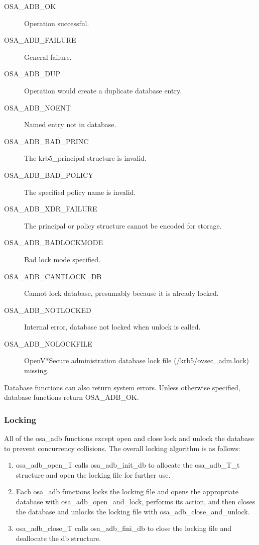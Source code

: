 \begin{description}
\item[OSA_ADB_OK] Operation successful.
\item[OSA_ADB_FAILURE] General failure.
\item[OSA_ADB_DUP] Operation would create a duplicate database entry.
\item[OSA_ADB_NOENT] Named entry not in database.
\item[OSA_ADB_BAD_PRINC] The krb5_principal structure is invalid.
\item[OSA_ADB_BAD_POLICY] The specified policy name is invalid.
\item[OSA_ADB_XDR_FAILURE] The principal or policy structure cannot be
encoded for storage.
\item[OSA_ADB_BADLOCKMODE] Bad lock mode specified.
\item[OSA_ADB_CANTLOCK_DB] Cannot lock database, presumably because it
is already locked.
\item[OSA_ADB_NOTLOCKED] Internal error, database not locked when
unlock is called.
\item[OSA_ADB_NOLOCKFILE] OpenV*Secure administration database lock
file (/krb5/ovsec_adm.lock) missing.
\end{description}

Database functions can also return system errors.  Unless otherwise
specified, database functions return OSA_ADB_OK.

\subsubsection{Locking}

All of the osa_adb functions except open and close lock and unlock the
database to prevent concurrency collisions.  The overall locking
algorithm is as follows:

\begin{enumerate}
\item osa_adb_open_T calls osa_adb_init_db to allocate the osa_adb_T_t
structure and open the locking file for further use.

\item Each osa_adb functions locks the locking file and opens the
appropriate database with osa_adb_open_and_lock, performs its action,
and then closes the database and unlocks the locking file with
osa_adb_close_and_unlock.

\item osa_adb_close_T calls osa_adb_fini_db to close the locking file
and deallocate the db structure.
\end{enumerate}

